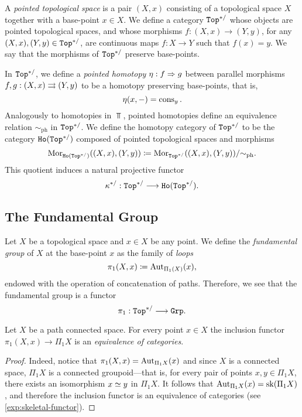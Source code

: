 \begin{definition}
\label{def:base-point-preserving-Top-cat}
A \emph{pointed topological space} is a pair \((X, x)\) consisting of a
topological space \(X\) together with a base-point \(x \in X\). We define a
category \({\texttt{Top}^{*/}}\) whose objects are pointed topological spaces, and whose
morphisms \(f: (X, x) \to (Y, y)\), for any \((X, x), (Y, y) \in {\texttt{Top}^{*/}}\), are
continuous maps \(f: X \to Y\) such that \(f(x) = y\). We say that the morphisms
of \({\texttt{Top}^{*/}}\) preserve base-points.

In \({\texttt{Top}^{*/}}\), we define a \emph{pointed homotopy} \(\eta: f \Rightarrow g\) between
parallel morphisms \(f, g: (X, x) \rightrightarrows (Y, y)\) to be a homotopy preserving
base-points, that is,
\[
\eta(x, -) = \operatorname{cons}_y.
\]
Analogously to homotopies in \(\Top\), pointed homotopies define an equivalence
relation \(\sim_{\text{ph}}\) in \({\texttt{Top}^{*/}}\). We define the homotopy category of
\({\texttt{Top}^{*/}}\) to be the category \({\texttt{Ho}({\texttt{Top}^{*/}})}\) composed of pointed topological
spaces and morphisms
\[
\operatorname{Mor}_{{\texttt{Ho}({\texttt{Top}^{*/}})}}((X, x), (Y, y))
\coloneq \operatorname{Mor}_{{\texttt{Top}^{*/}}}((X, x), (Y, y))/{\sim_{\text{ph}}}.
\]
This quotient induces a natural projective functor
\[
\kappa^{*/}: {\texttt{Top}^{*/}} \longrightarrow {\texttt{Ho}({\texttt{Top}^{*/}})}.
\]
\end{definition}

\subsection{The Fundamental Group}

\begin{definition}
\label{def:fundamental-group}
Let \(X\) be a topological space and \(x \in X\) be any point. We define
the \emph{fundamental group} of \(X\) at the base-point \(x\) as the family of
\emph{loops}
\[
\pi_1(X, x) \coloneq \operatorname{Aut}_{\Pi_1(X)}(x),
\]
endowed with the operation of concatenation of paths. Therefore, we see that the
fundamental group is a functor
\[
\pi_1: {\texttt{Top}^{*/}} \longrightarrow {\texttt{Grp}}.
\]
\end{definition}

\begin{proposition}
\label{prop:pi1-equivalent-to-Pi1-for-connected-space}
Let \(X\) be a path connected space. For every point \(x \in X\) the inclusion
functor \(\pi_1(X, x) \to \Pi_1 X\) is an \emph{equivalence of categories}.
\end{proposition}

\begin{proof}
Indeed, notice that \(\pi_1(X, x) = \operatorname{Aut}_{\Pi_1 X}(x)\) and since \(X\) is a
connected space, \(\Pi_1 X\) is a connected groupoid---that is, for every pair
of points \(x, y \in \Pi_1 X\), there exists an isomorphism \(x \simeq y\) in
\(\Pi_1 X\). It follows that \(\operatorname{Aut}_{\Pi_1 X} (x) = \operatorname{sk} (\Pi_1 X)\), and
therefore the inclusion functor is an equivalence of categories (see
\cref{exp:skeletal-functor}).
\end{proof}

